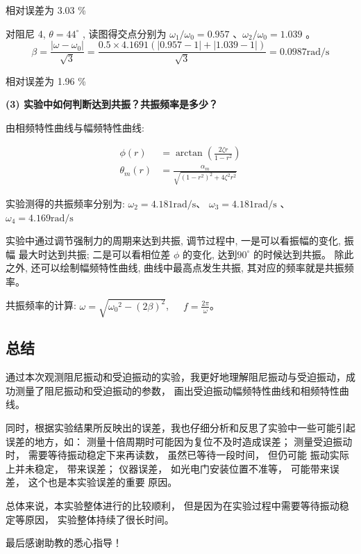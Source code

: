 \documentclass[UTF8]{ctexart}
\begin{document}
相对误差为  3.03 \% 

对阻尼  4, $\theta=44^{\circ}$ , 读图得交点分别为 $ \omega_{1} / \omega_{0}=0.957$ 、$ \omega_{2} / \omega_{0}=1.039 $ 。
$$
\beta=\frac{\left|\omega-\omega_{0}\right|}{\sqrt{3}}=\frac{0.5 \times 4.1691(|0.957-1|+|1.039-1|)}{\sqrt{3}}=0.0987 \mathrm{rad} / \mathrm{s}
$$

相对误差为  1.96 \% 

\noindent  \textbf{(3) 实验中如何判断达到共振？共振频率是多少？}

由相频特性曲线与幅频特性曲线:

\begin{align}
\phi(r)&=\arctan \left(\frac{2 \zeta r}{1-r^{2}}\right) \nonumber\\
\theta_{m}(r)&=\frac{\alpha_{m}}{\sqrt{\left(1-r^{2}\right)^{2}+4 \zeta^{2} r^{2}}}\nonumber
\end{align}


实验测得的共振频率分别为: $ \omega_{2}=4.181 \mathrm{rad} / \mathrm{s} $、 $\omega_{3}=4.181 \mathrm{rad} / \mathrm{s}$ 、 $\omega_{4}=4.169 \mathrm{rad} / \mathrm{s} $

实验中通过调节强制力的周期来达到共振, 调节过程中, 一是可以看振幅的变化, 振幅 最大时达到共振; 二是可以看相位差  $\phi $ 的变化, 达到$90^\circ$ 的时候达到共振。
除此之外, 还可以绘制幅频特性曲线, 曲线中最高点发生共振, 其对应的频率就是共振频率。

共振频率的计算:
$ \omega=\sqrt{\omega_{0}{ }^{2}-(2 \beta)^{2}} $,~~~$f=\frac{2\pi}{\omega}$。


\subsection{总结}

通过本次观测阻尼振动和受迫振动的实验，我更好地理解阻尼振动与受迫振动，成功测量了阻尼振动和受迫振动的参数， 画出受迫振动幅频特性曲线和相频特性曲线。

同时，根据实验结果所反映出的误差，我也仔细分析和反思了实验中一些可能引起误差的地方，如：
测量十倍周期时可能因为复位不及时造成误差；
 测量受迫振动时， 需要等待振动稳定下来再读数， 虽然已等待一段时间， 但仍可能
振动实际上并未稳定， 带来误差；
 仪器误差， 如光电门安装位置不准等， 可能带来误差， 这个也是本实验误差的重要
原因。

总体来说，本实验整体进行的比较顺利， 但是因为在实验过程中需要等待振动稳定等原因， 实验整体持续了很长时间。



最后感谢助教的悉心指导！
\\
\\
\end{document}
